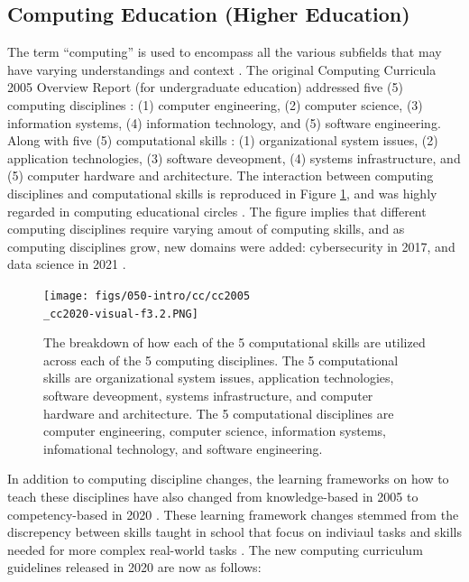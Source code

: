 \documentclass[010-intro.tex]{subfiles}
\begin{document}
\subsection{Computing Education (Higher Education)}

    The term ``computing'' is used to encompass all the various subfields that may have varying understandings and context
    \cite{cc2005, cc2020}.
    The original Computing Curricula 2005 Overview Report (for undergraduate education)
    addressed five (5) computing disciplines \cite{cc2005}:
    (1) computer engineering,
    (2) computer science,
    (3) information systems,
    (4) information technology, and
    (5) software engineering.
    Along with five (5) computational skills \cite{cc2005, cc2020}:
    (1) organizational system issues,
    (2) application technologies,
    (3) software deveopment,
    (4) systems infrastructure, and
    (5) computer hardware and architecture.
    The interaction between computing disciplines and computational skills is reproduced in
    Figure \ref{fig:comp-disciplines-comp-skills},
    and was highly regarded in computing educational circles
    \cite{cc2005, cc2020}.
    The figure implies that different computing disciplines require varying amout of computing skills,
    and as computing disciplines grow, new domains were added:
    cybersecurity in 2017, and
    data science in 2021
    \cite{ccdsc2021}.

    \begin{figure}[htb]
        \centering
        \texttt{[image: figs/050-intro/cc/cc2005\\\_cc2020-visual-f3.2.PNG]}
        \caption[Computational skills across computing disciplines]{
            The breakdown of how each of the 5 computational skills are utilized across each of the 5 computing disciplines.
            The 5 computational skills are
            organizational system issues, application technologies, software deveopment, systems infrastructure, and computer hardware and architecture.
            The 5 computational disciplines are
            computer engineering, computer science, information systems, infomational technology, and software engineering.
        }
        \label{fig:comp-disciplines-comp-skills}
    \end{figure}

    In addition to computing discipline changes,
    the learning frameworks on how to teach these disciplines have also changed
    from knowledge-based in 2005 to competency-based in 2020
    \cite{cc2020}.
    These learning framework changes stemmed from the discrepency between
    skills taught in school that focus on indiviaul tasks and skills needed for more complex real-world tasks
    \cite{cc2020}.
    The new computing curriculum guidelines released in 2020 are now as follows:
\end{document}
